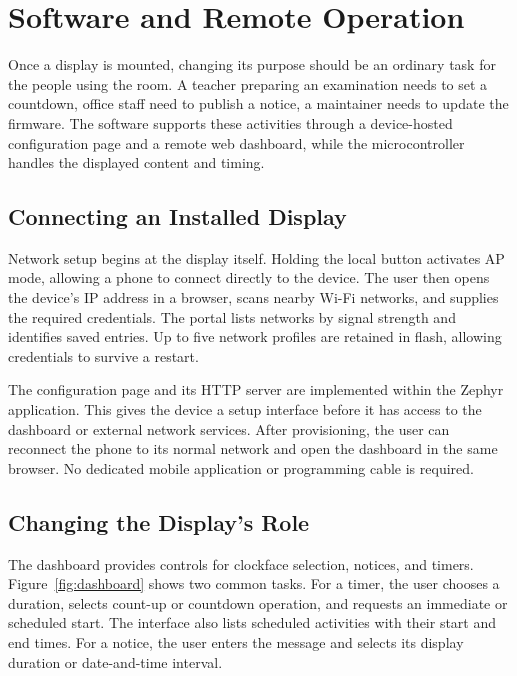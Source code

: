 \section{Software and Remote Operation}
\label{sec:software}

Once a display is mounted, changing its purpose should be an ordinary task for the people using the room. A teacher preparing an examination needs to set a countdown, office staff need to publish a notice, a maintainer needs to update the firmware. The software supports these activities through a device-hosted configuration page and a remote web dashboard, while the microcontroller handles the displayed content and timing.

\subsection{Connecting an Installed Display}

Network setup begins at the display itself. Holding the local button activates AP mode, allowing a phone to connect directly to the device. The user then opens the device's IP address in a browser, scans nearby Wi-Fi networks, and supplies the required credentials. The portal lists networks by signal strength and identifies saved entries. Up to five network profiles are retained in flash, allowing credentials to survive a restart.

The configuration page and its HTTP server are implemented within the Zephyr application. This gives the device a setup interface before it has access to the dashboard or external network services. After provisioning, the user can reconnect the phone to its normal network and open the dashboard in the same browser. No dedicated mobile application or programming cable is required.

\subsection{Changing the Display's Role}

The dashboard provides controls for clockface selection, notices, and timers. Figure~\ref{fig:dashboard} shows two common tasks. For a timer, the user chooses a duration, selects count-up or countdown operation, and requests an immediate or scheduled start. The interface also lists scheduled activities with their start and end times. For a notice, the user enters the message and selects its display duration or date-and-time interval.

